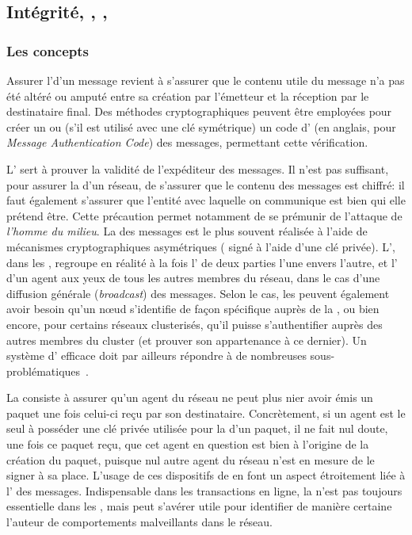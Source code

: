 \subsection{Intégrité, , , }

    \subsubsection{Les concepts}
Assurer l'\integrite d'un message revient à s'assurer que le contenu utile du message n'a pas été altéré ou amputé entre sa création par l'émetteur et la réception par le destinataire final.
Des méthodes cryptographiques peuvent être employées pour créer un  ou (s'il est utilisé avec une clé symétrique) un code d' (\macc en anglais, pour \textit{Message Authentication Code}) des messages, permettant cette vérification.

L' sert à prouver la validité de l'expéditeur des messages.
Il n'est pas suffisant, pour assurer la \secu d'un réseau, de s'assurer que le contenu des messages est chiffré: il faut également s'assurer que l'entité avec laquelle on communique est bien qui elle prétend être.
Cette précaution permet notamment de se prémunir de l'attaque de \textit{l'homme du milieu}.
La  des messages est le plus souvent réalisée à l'aide de mécanismes cryptographiques asymétriques ( signé à l'aide d'une clé privée).
L', dans les \rcsfs, regroupe en réalité à la fois l' de deux parties l'une envers l'autre, et l' d'un agent aux yeux de tous les autres membres du réseau, dans le cas d'une diffusion générale (\textit{broadcast}) des messages.
Selon le cas, les \rcs peuvent également avoir besoin qu'un nœud s'identifie de façon spécifique auprès de la \sdb, ou bien encore, pour certains réseaux clusterisés, qu'il puisse s'authentifier auprès des autres membres du cluster (et prouver son appartenance à ce dernier).
Un système d' efficace doit par ailleurs répondre à de nombreuses sous-problématiques~\cite{KKA15}.

La  consiste à assurer qu'un agent du réseau ne peut plus nier avoir émis un paquet une fois celui-ci reçu par son destinataire.
Concrètement, si un agent est le seul à posséder une clé privée utilisée pour la  d'un paquet, il ne fait nul doute, une fois ce paquet reçu, que cet agent en question est bien à l'origine de la création du paquet, puisque nul autre agent du réseau n'est en mesure de le signer à sa place.
L'usage de ces dispositifs de  en font un aspect étroitement liée à l' des messages.
Indispensable dans les transactions en ligne, la  n'est pas toujours essentielle dans les \rcs, mais peut s'avérer utile pour identifier de manière certaine l'auteur de comportements malveillants dans le réseau.

